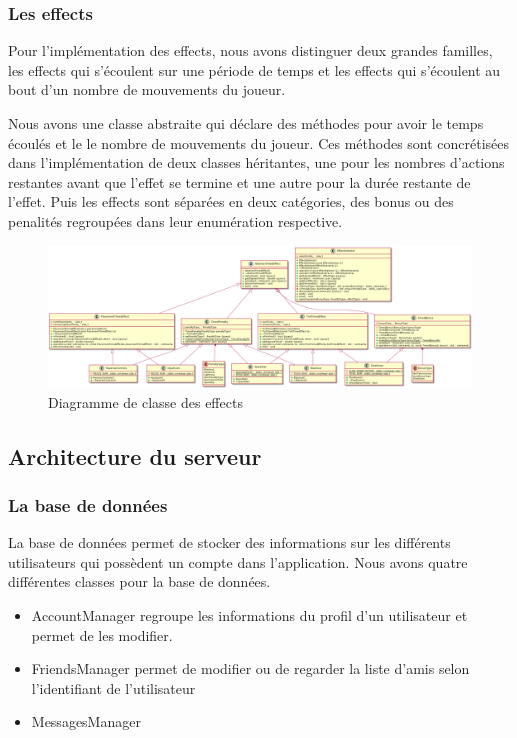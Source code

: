 \documentclass{article}
\begin{document}
\subsubsection*{Les effects}

Pour l'implémentation des effects, nous avons distinguer deux grandes familles, les effects qui s'écoulent sur une période de temps et les effects qui s'écoulent au bout d'un nombre de mouvements du joueur.

Nous avons une classe abstraite qui déclare des méthodes pour avoir le temps écoulés et le le nombre de mouvements du joueur. Ces méthodes sont concrétisées dans l'implémentation de deux classes héritantes, une pour les nombres d'actions restantes avant que l'effet se termine et une autre pour la durée restante de l'effet. Puis les effects sont séparées en deux catégories, des bonus ou des penalités regroupées dans leur enumération respective. 

\begin{figure}[!ht]
    \centering
    \includegraphics[scale=0.2]{../res/uml/class/EffectClass.png}
    \caption{Diagramme de classe des effects}
    \label{fig:Royal-Competition}
\end{figure}


\subsection{Architecture du serveur}

\subsubsection{La base de données}

La base de données permet de stocker des informations sur les différents utilisateurs qui possèdent un compte dans l'application. Nous avons quatre différentes classes pour la base de données. 
\begin{itemize}
	\item AccountManager regroupe les informations du profil d'un utilisateur et permet de les modifier.
	\item FriendsManager permet de modifier ou de regarder la liste d'amis selon l'identifiant de l'utilisateur
	\item MessagesManager 
\end{itemize}
\end{document}
